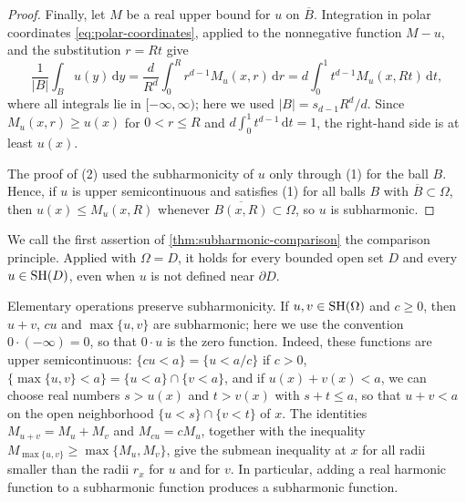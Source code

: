 \begin{proof}
Finally, let $M$ be a real upper bound for $u$ on $\overline B$. Integration in polar coordinates \eqref{eq:polar-coordinates}, applied to the nonnegative function $M-u$, and the substitution $r=Rt$ give
\begin{equation}\label{eq:ball-average-spherical-means}
 \frac{1}{|B|}\int_Bu(y)\,\mathrm d y=\frac{d}{R^d}\int_0^Rr^{d-1}M_u(x,r)\,\mathrm d r=d\int_0^1t^{d-1}M_u(x,Rt)\,\mathrm d t,
\end{equation}
where all integrals lie in $[-\infty,\infty)$; here we used $|B|=s_{d-1}R^d/d$. Since $M_u(x,r)\geq u(x)$ for $0<r\leq R$ and $d\int_0^1t^{d-1}\,\mathrm dt=1$, the right-hand side is at least $u(x)$.

The proof of (2) used the subharmonicity of $u$ only through (1) for the ball $B$. Hence, if $u$ is upper semicontinuous and satisfies (1) for all balls $B$ with $\overline B\subset\Omega$, then $u(x)\leq M_u(x,R)$ whenever $\overline{B(x,R)}\subset\Omega$, so $u$ is subharmonic.
\end{proof}

We call the first assertion of \cref{thm:subharmonic-comparison} the comparison principle. Applied with $\Omega=D$, it holds for every bounded open set $D$ and every $u\in\mathrm{SH}(D)$, even when $u$ is not defined near $\partial D$.

Elementary operations preserve subharmonicity. If $u,v\in\mathrm{SH}(\Omega)$ and $c\geq0$, then $u+v$, $cu$ and $\max\{u,v\}$ are subharmonic; here we use the convention $0\cdot(-\infty)=0$, so that $0\cdot u$ is the zero function. Indeed, these functions are upper semicontinuous: $\{cu<a\}=\{u<a/c\}$ if $c>0$, $\{\max\{u,v\}<a\}=\{u<a\}\cap\{v<a\}$, and if $u(x)+v(x)<a$, we can choose real numbers $s>u(x)$ and $t>v(x)$ with $s+t\leq a$, so that $u+v<a$ on the open neighborhood $\{u<s\}\cap\{v<t\}$ of $x$. The identities $M_{u+v}=M_u+M_v$ and $M_{cu}=cM_u$, together with the inequality $M_{\max\{u,v\}}\geq\max\{M_u,M_v\}$, give the submean inequality at $x$ for all radii smaller than the radii $r_x$ for $u$ and for $v$. In particular, adding a real harmonic function to a subharmonic function produces a subharmonic function.

